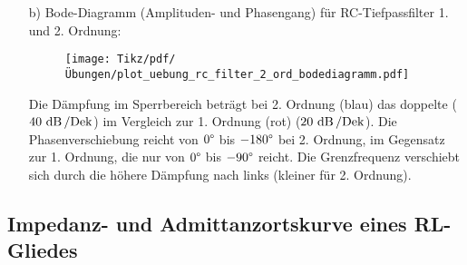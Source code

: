 {\begin{itemize}
\begin{align*}
            &= \frac{1}{1 - \Omega^2 + \mathrm{j}3\Omega} = \frac{1}{1 - (\omega C R)^2 + \mathrm{j}3\omega C R}
    \end{align*}
    Vergleich einfacher Tiefpass:
    \begin{align*}
        \underline{F}(\mathrm{j}\omega) = \frac{\frac{1}{\mathrm{j}\omega C}}{R + \frac{1}{\mathrm{j}\omega C}} = \frac{1}{1 + \mathrm{j}\omega C R} = \frac{1}{1 + \mathrm{j}\Omega}
    \end{align*}
    Wegen Kopplungseffekten kann der Frequenzgang des einfachen Tiefpasses bei Serienschaltung 
    nicht einfach multipliziert werden.

    \item[b)] Bode-Diagramm (Amplituden- und Phasengang) für RC-Tiefpassfilter 1. und 2. Ordnung:
    \begin{figure}[H]\centering
        \texttt{[image: Tikz/pdf/Übungen/plot\_uebung\_rc\_filter\_2\_ord\_bodediagramm.pdf]}%
    \end{figure}
    Die Dämpfung im Sperrbereich beträgt bei 2. Ordnung (blau) das doppelte ($40\,\operatorname{dB}/\mathrm{Dek}$) 
    im Vergleich zur 1. Ordnung (rot) ($20\,\operatorname{dB}/\mathrm{Dek}$). 
    Die Phasenverschiebung reicht von $0\degree$ bis $-180\degree$ bei 2. Ordnung, 
    im Gegensatz zur 1. Ordnung, die nur von $0\degree$ bis $-90\degree$ reicht.
    Die Grenzfrequenz verschiebt sich durch die höhere Dämpfung nach links (kleiner für 2. Ordnung).
\end{itemize}
}


\subsection{Impedanz- und Admittanzortskurve eines RL-Gliedes\label{ueb:ortskurve:rl}}

